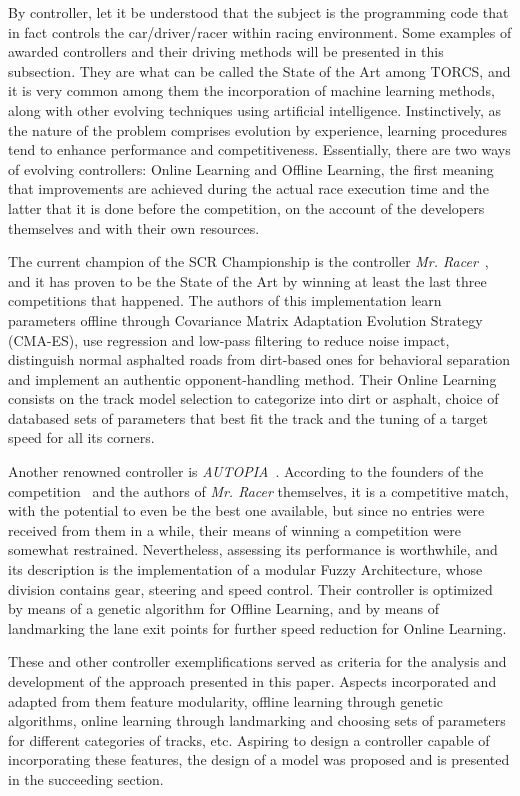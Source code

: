 	By controller, let it be understood that the subject is the programming code that in fact controls the
	car/driver/racer within racing environment. Some examples of awarded controllers and their driving methods
	will be presented in this subsection. They are what can be called the State of the Art among TORCS, and it is
	very common among them the incorporation of machine learning methods, along with other evolving techniques
	using artificial intelligence. Instinctively, as the nature of the problem comprises evolution by experience,
	learning procedures tend to enhance performance and competitiveness. Essentially, there are two ways of
	evolving controllers: Online Learning and Offline Learning, the first meaning that improvements are achieved
	during the actual race execution time and the latter that it is done before the competition, on the account of
	the developers themselves and with their own resources.
	
	The current champion of the SCR Championship is the controller \emph{Mr. Racer}~\cite{MrRacer}, and it has
	proven to be the State of the Art by winning at least the last three competitions that happened. The authors
	of this implementation learn parameters offline through Covariance Matrix Adaptation Evolution Strategy
	(CMA-ES), use regression and low-pass filtering to reduce noise impact, distinguish normal asphalted roads
	from dirt-based ones for behavioral separation and implement an authentic opponent-handling method. Their
	Online Learning consists on the track model selection to categorize into dirt or asphalt, choice of databased
	sets of parameters that best fit the track and the tuning of a target speed for all its corners.
	
	Another renowned controller is \emph{AUTOPIA}~\cite{AUTOPIA}. According to the founders of the
	competition~\cite{SCRC} and the authors of \emph{Mr. Racer} themselves, it is a competitive match, with the
	potential to even be the best one available, but since no entries were received from them in a while, their
	means of winning a competition were somewhat restrained. Nevertheless, assessing its performance is
	worthwhile, and its description is the implementation of a modular Fuzzy Architecture, whose division contains
	gear, steering and speed control. Their controller is optimized by means of a genetic algorithm for Offline
	Learning, and by means of landmarking the lane exit points for further speed reduction for Online Learning.
	
	These and other controller exemplifications served as criteria for the analysis and development of the
	approach presented in this paper. Aspects incorporated and adapted from them feature modularity, offline learning
	through genetic algorithms, online learning through landmarking and choosing sets of parameters for different
	categories of tracks, etc. Aspiring to design a controller capable of incorporating these features, the design of
	a model was proposed and is presented in the succeeding section.
	